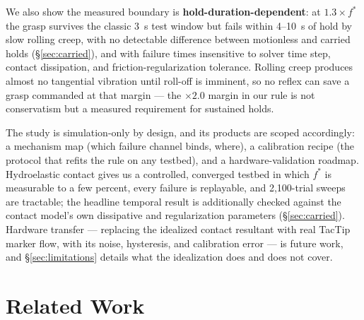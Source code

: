 \documentclass[journal]{IEEEtran}
\newcommand{\fstar}{f^{*}}
\begin{document}
We also show the measured boundary is \textbf{hold-duration-dependent}: at
$1.3\times\fstar$ the grasp survives the classic 3~s test window but fails
within 4--10~s of hold by slow rolling creep, with no detectable difference
between motionless and carried holds (\S\ref{sec:carried}), and with
failure times insensitive to solver time step, contact dissipation, and
friction-regularization tolerance. Rolling creep produces
almost no tangential vibration until roll-off is imminent, so no reflex can
save a grasp commanded at that margin --- the $\times 2.0$ margin in our
rule is not conservatism but a measured requirement for sustained holds.

The study is simulation-only by design, and its products are scoped
accordingly: a mechanism map (which failure channel binds, where), a
calibration recipe (the protocol that refits the rule on any testbed), and
a hardware-validation roadmap. Hydroelastic contact gives us a controlled,
converged testbed in which $\fstar$ is measurable to a few percent, every
failure is replayable, and 2{,}100-trial sweeps are tractable; the
headline temporal result is additionally checked against the contact
model's own dissipative and regularization parameters
(\S\ref{sec:carried}). Hardware transfer --- replacing the idealized
contact resultant with real TacTip marker flow, with its noise,
hysteresis, and calibration error \cite{lepora2021soft} --- is future
work, and \S\ref{sec:limitations} details what the idealization does and
does not cover.

\section{Related Work}
\end{document}
